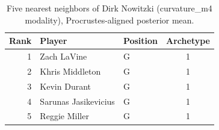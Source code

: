 \begin{table}[htbp]
  \centering\small
  \begin{tabular}{rllc}
    \toprule
    Rank & Player & Position & Archetype \\
    \midrule
    1 & Zach LaVine & G & 1 \\
    2 & Khris Middleton & G & 1 \\
    3 & Kevin Durant & G & 1 \\
    4 & Sarunas Jasikevicius & G & 1 \\
    5 & Reggie Miller & G & 1 \\
    \bottomrule
  \end{tabular}
  \caption{Five nearest neighbors of Dirk Nowitzki (curvature_m4 modality), Procrustes-aligned posterior mean.}
  \label{tab:Dirk_Nowitzki_neighbors_curvature_m4}
\end{table}

